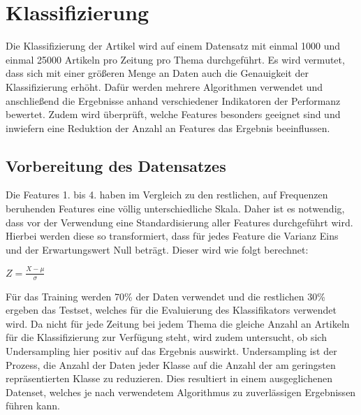 \section{Klassifizierung}
Die Klassifizierung der Artikel wird auf einem Datensatz mit einmal 1000 und einmal 25000 Artikeln pro Zeitung pro Thema durchgeführt. Es wird vermutet, dass sich mit einer größeren Menge an Daten auch die Genauigkeit der Klassifizierung erhöht. Dafür werden mehrere Algorithmen verwendet und anschließend die Ergebnisse anhand verschiedener Indikatoren der Performanz bewertet. Zudem wird überprüft, welche Features besonders geeignet sind und inwiefern eine Reduktion der Anzahl an Features das Ergebnis beeinflussen.


\subsection{Vorbereitung des Datensatzes}
Die Features 1. bis 4. haben im Vergleich zu den restlichen, auf Frequenzen beruhenden Features eine völlig unterschiedliche Skala. Daher ist es notwendig, dass vor der Verwendung eine Standardisierung aller Features durchgeführt wird. Hierbei werden diese so transformiert, dass für jedes Feature die Varianz Eins und der Erwartungswert Null beträgt. Dieser wird wie folgt berechnet:

\(Z = \frac{X-\mu}{\sigma}\)

Für das Training werden 70\% der Daten verwendet und die restlichen 30\% ergeben das Testset, welches für die Evaluierung des Klassifikators verwendet wird. Da nicht für jede Zeitung bei jedem Thema die gleiche Anzahl an Artikeln für die Klassifizierung zur Verfügung steht, wird zudem untersucht, ob sich Undersampling hier positiv auf das Ergebnis auswirkt. Undersampling ist der Prozess, die Anzahl der Daten jeder Klasse auf die Anzahl der am geringsten repräsentierten Klasse zu reduzieren. Dies resultiert in einem ausgeglichenen Datenset, welches je nach verwendetem Algorithmus zu zuverlässigen Ergebnissen führen kann.

